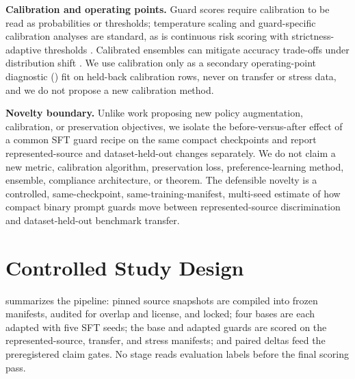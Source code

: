 \documentclass[sigconf,nonacm]{acmart}
\begin{document}
\textbf{Calibration and operating points.} Guard scores require calibration to be read as probabilities or thresholds; temperature scaling \cite{guo2017calibration} and guard-specific calibration analyses \cite{liu2025calibration} are standard, as is continuous risk scoring with strictness-adaptive thresholds \cite{flexguard2026}. Calibrated ensembles can mitigate accuracy trade-offs under distribution shift \cite{kumar2022calibrated}. We use calibration only as a secondary operating-point diagnostic () fit on held-back calibration rows, never on transfer or stress data, and we do not propose a new calibration method.

\textbf{Novelty boundary.} Unlike work proposing new policy augmentation, calibration, or preservation objectives, we isolate the before-versus-after effect of a common SFT guard recipe on the same compact checkpoints and report represented-source and dataset-held-out changes separately. We do not claim a new metric, calibration algorithm, preservation loss, preference-learning method, ensemble, compliance architecture, or theorem. The defensible novelty is a controlled, same-checkpoint, same-training-manifest, multi-seed estimate of how compact binary prompt guards move between represented-source discrimination and dataset-held-out benchmark transfer.

\section{Controlled Study Design}
\label{sec:design}

 summarizes the pipeline: pinned source snapshots are compiled into frozen manifests, audited for overlap and license, and locked; four bases are each adapted with five SFT seeds; the base and adapted guards are scored on the represented-source, transfer, and stress manifests; and paired deltas feed the preregistered claim gates. No stage reads evaluation labels before the final scoring pass.
\end{document}
